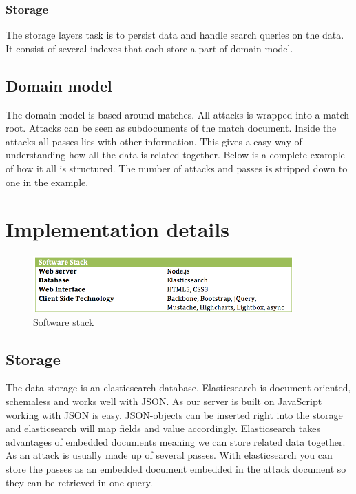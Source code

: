 \subsubsection{Storage}

The storage layers task is to persist data and handle search queries on the data. It consist of several indexes that each store a part of domain model. 

\subsection{Domain model}

The domain model is based around matches. All attacks is wrapped into a match root. Attacks can be seen as subdocuments of the match document. Inside the attacks all passes lies with other information. This gives a easy way of understanding how all the data is related together. Below is a complete example of how it all is structured. The number of attacks and passes is stripped down to one in the example.



\section{Implementation details}

\begin{figure}[ht!]
\centering
\includegraphics[width=100mm]{images/implementation/software_stack.png}
\caption{Software stack}
\label{overflow}
\end{figure}

\subsection{Storage}

The data storage is an elasticsearch database\cite{elasticsearch:mainsite}. Elasticsearch is document oriented, schemaless and works well with JSON\footnotemark. As our server is built on JavaScript working with JSON is easy. JSON-objects can be inserted right into the storage and elasticsearch will map fields and value accordingly. 
Elasticsearch takes advantages of embedded documents meaning we can store related data together. As an attack is usually made up of several passes. With elasticsearch you can store the passes as an embedded document embedded in the attack document so they can be retrieved in one query. 

